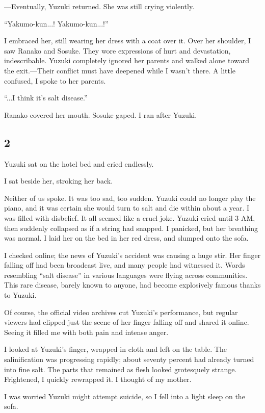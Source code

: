 \documentclass[
    a4paper,
    12pt,
    twoside,
    openany,
    UTF8,
    fontset=windows
]{ctexbook}
\begin{document}
---Eventually, Yuzuki returned. She was still crying violently.

``Yakumo-kun...! Yakumo-kun...!''

I embraced her, still wearing her dress with a coat over it. Over her shoulder, I saw Ranako and Sosuke. They wore expressions of hurt and devastation, indescribable. Yuzuki completely ignored her parents and walked alone toward the exit.---Their conflict must have deepened while I wasn't there. A little confused, I spoke to her parents.

``...I think it's salt disease.''

Ranako covered her mouth. Sosuke gaped. I ran after Yuzuki.


\subsection*{2}

Yuzuki sat on the hotel bed and cried endlessly.

I sat beside her, stroking her back.

Neither of us spoke. It was too sad, too sudden. Yuzuki could no longer play the piano, and it was certain she would turn to salt and die within about a year. I was filled with disbelief. It all seemed like a cruel joke. Yuzuki cried until 3 AM, then suddenly collapsed as if a string had snapped. I panicked, but her breathing was normal. I laid her on the bed in her red dress, and slumped onto the sofa.

I checked online; the news of Yuzuki's accident was causing a huge stir. Her finger falling off had been broadcast live, and many people had witnessed it. Words resembling ``salt disease'' in various languages were flying across communities. This rare disease, barely known to anyone, had become explosively famous thanks to Yuzuki.

Of course, the official video archives cut Yuzuki's performance, but regular viewers had clipped just the scene of her finger falling off and shared it online. Seeing it filled me with both pain and intense anger.

I looked at Yuzuki's finger, wrapped in cloth and left on the table. The salinification was progressing rapidly; about seventy percent had already turned into fine salt. The parts that remained as flesh looked grotesquely strange. Frightened, I quickly rewrapped it. I thought of my mother.

I was worried Yuzuki might attempt suicide, so I fell into a light sleep on the sofa.
\end{document}
